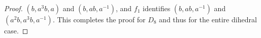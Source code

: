 \documentclass{dcthesis}
\newcommand{\wt}[1]{\widetilde{#1}}
\numberwithin{equation}{section}
\theoremstyle{definition}
\theoremstyle{remark}
\begin{document}
{{{\begin{proof}
      $(b,a^3b,a)$
      and
      $(b,ab,a^{-1})$,
      and
      $f_1$ identifies
      $(b,ab,a^{-1})$
      and
      $(a^2b,a^3b,a^{-1})$.
      This completes the proof for $D_8$
      and thus for the entire dihedral case.
    \end{proof}
}}}
\end{document}
